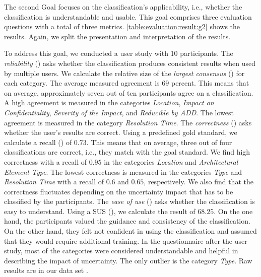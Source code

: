 The second Goal  focuses on the classification's applicability, i.e., whether the classification is understandable and usable.
This goal comprises three evaluation questions with a total of three metrics.
\autoref{table:evaluation:result:g2} shows the results.
Again, we split the presentation and interpretation of the results.

To address this goal, we conducted a user study with 10 participants.
The \emph{reliability} () asks whether the classification produces consistent results when used by multiple users.
We calculate the relative size of the \emph{largest consensus} () for each category.
The average measured agreement is $69$ percent.
This means that on average, approximately seven out of ten participants agree on a classification.
A high agreement is measured in the categories \emph{Location}, \emph{Impact on Confidentiality}, \emph{Severity of the Impact}, and \emph{Reducible by ADD}.
The lowest agreement is measured in the category \emph{Resolution Time}.
The \emph{correctness} () asks whether the user's results are correct.
Using a predefined gold standard, we calculate a recall () of $0.73$.
This means that on average, three out of four classifications are correct, i.e., they match with the goal standard.
We find high correctness with a recall of $0.95$ in the categories \emph{Location} and \emph{Architectural Element Type}.
The lowest correctness is measured in the categories \emph{Type} and \emph{Resolution Time} with a recall of $0.6$ and $0.65$, respectively.
We also find that the correctness fluctuates depending on the uncertainty impact that has to be classified by the participants.
The \emph{ease of use} () asks whether the classification is easy to understand.
Using a \ac{SUS} (), we calculate the result of $68.25$.
On the one hand, the participants valued the guidance and consistency of the classification.
On the other hand, they felt not confident in using the classification and assumed that they would require additional training.
In the questionnaire after the user study, most of the categories were considered understandable and helpful in describing the impact of uncertainty.
The only outlier is the category \emph{Type}.
Raw results are in our data set \cite{dataset}.

